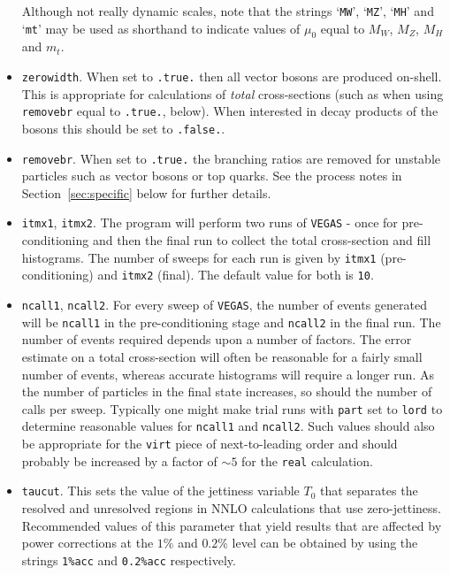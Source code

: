 \documentclass[12pt]{article}
\begin{document}
\begin{itemize}
Although not really dynamic scales, note that the strings `{\tt MW}', `{\tt MZ}',
`{\tt MH}' and `{\tt mt}' may be used as shorthand to indicate values of $\mu_0$ equal to
$M_W$, $M_Z$, $M_H$ and $m_t$. 

\item {\tt zerowidth}. When set to {\tt .true.} then all vector
bosons are produced on-shell. This is appropriate for calculations
of {\it total} cross-sections (such as when using {\tt removebr} equal
to {\tt .true.}, below). When interested in decay products of the
bosons this should be set to {\tt .false.}.

\item {\tt removebr}. When set to {\tt .true.} the branching ratios are 
removed for unstable particles such as vector bosons or top quarks. See the
process notes in Section~\ref{sec:specific} below for further details.

\item {\tt itmx1}, {\tt itmx2}. The program will perform two runs of
{\tt VEGAS} - once for pre-conditioning and then the final run to
collect the total cross-section and fill histograms. The number of
sweeps for each run is given by {\tt itmx1} (pre-conditioning)
and {\tt itmx2} (final). The default value for both is {\tt 10}.


\item {\tt ncall1}, {\tt ncall2}. For every sweep of {\tt VEGAS},
the number of events generated will be {\tt ncall1} in the
pre-conditioning stage and {\tt ncall2} in the final run. The number
of events required depends upon a number of factors. The error
estimate on a total cross-section will often be reasonable for a
fairly small number of events, whereas accurate histograms will
require a longer run. As the number of particles in the final state
increases, so should the number of calls per sweep. Typically one
might make trial runs with {\tt part} set to {\tt lord} to determine
reasonable values for {\tt ncall1} and {\tt ncall2}. Such values
should also be appropriate for the {\tt virt} piece of
next-to-leading order and should probably be increased by a factor of
$\sim 5$ for the {\tt real} calculation.

\item {\tt taucut}. This sets the value of the jettiness variable
$T_0$ that separates the resolved and unresolved regions in NNLO
calculations that use zero-jettiness.  Recommended values of this
parameter that yield results that are affected by power corrections
at the $1$\% and $0.2$\% level can be obtained by using the
strings {\tt 1\%acc} and {\tt 0.2\%acc} respectively.


\end{itemize}
\end{document}
